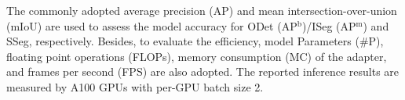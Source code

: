  The commonly adopted average precision (AP) and mean intersection-over-union (mIoU) are used to assess the model accuracy for ODet (AP$^\textrm{b}$)/ISeg (AP$^\textrm{m}$) and SSeg, respectively. Besides, to evaluate the efficiency, model Parameters (\#P), floating point operations (FLOPs), memory consumption (MC) of the adapter, and frames per second (FPS) are also adopted. The reported inference results are measured by A100 GPUs with per-GPU batch size 2.
%


